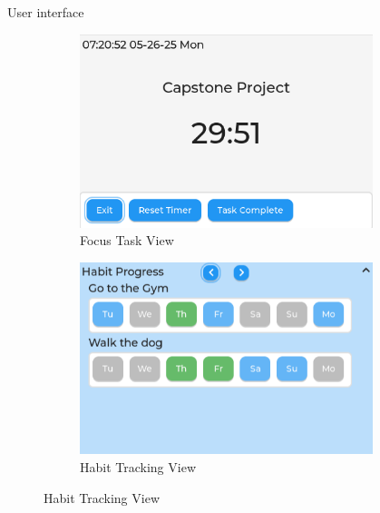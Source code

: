 \documentclass[final, cmyk]{beamer}
\newlength{\sepwidth}
\newlength{\colwidth}
\newlength{\bigcolwidth}
\newcommand{\separatorcolumn}{\begin{column}{\sepwidth}\end{column}}
\begin{document}
\begin{frame}[t]
\begin{columns}
\begin{column}{\bigcolwidth}
\begin{block}{User interface}
\begin{figure}
\begin{subfigure}{0.24\textwidth}
            \includegraphics[width=\textwidth]{focusTile.png}
            \caption{Focus Task View}
          \end{subfigure}
          \hfill
          \begin{subfigure}{0.24\textwidth}
            \includegraphics[width=\textwidth]{habitTile.png}
            \caption{Habit Tracking View}
          \end{subfigure}
        \end{figure} 
      \end{block}
    \end{column}
    \separatorcolumn
  \end{columns}

\end{frame}
\end{document}
